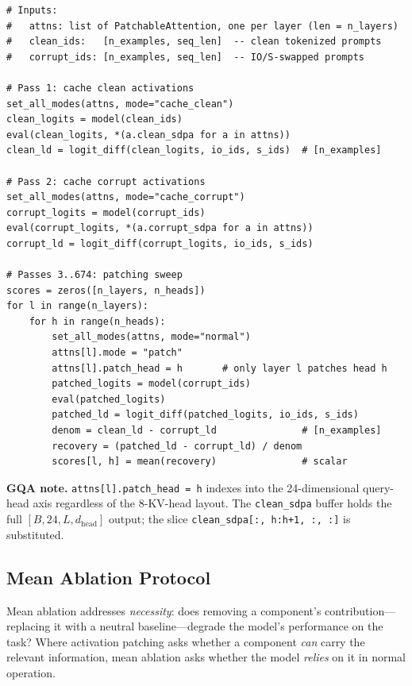 \documentclass[11pt,a4paper]{article}
\begin{document}
\begin{lstlisting}[style=python, caption={Pseudocode for the activation patching sweep. \texttt{attns} is a list of \texttt{PatchableAttention} modules, one per layer. \texttt{set\_all\_modes} sets every module's mode simultaneously.}]
# Inputs:
#   attns: list of PatchableAttention, one per layer (len = n_layers)
#   clean_ids:   [n_examples, seq_len]  -- clean tokenized prompts
#   corrupt_ids: [n_examples, seq_len]  -- IO/S-swapped prompts

# Pass 1: cache clean activations
set_all_modes(attns, mode="cache_clean")
clean_logits = model(clean_ids)
eval(clean_logits, *(a.clean_sdpa for a in attns))
clean_ld = logit_diff(clean_logits, io_ids, s_ids)  # [n_examples]

# Pass 2: cache corrupt activations
set_all_modes(attns, mode="cache_corrupt")
corrupt_logits = model(corrupt_ids)
eval(corrupt_logits, *(a.corrupt_sdpa for a in attns))
corrupt_ld = logit_diff(corrupt_logits, io_ids, s_ids)

# Passes 3..674: patching sweep
scores = zeros([n_layers, n_heads])
for l in range(n_layers):
    for h in range(n_heads):
        set_all_modes(attns, mode="normal")
        attns[l].mode = "patch"
        attns[l].patch_head = h       # only layer l patches head h
        patched_logits = model(corrupt_ids)
        eval(patched_logits)
        patched_ld = logit_diff(patched_logits, io_ids, s_ids)
        denom = clean_ld - corrupt_ld               # [n_examples]
        recovery = (patched_ld - corrupt_ld) / denom
        scores[l, h] = mean(recovery)               # scalar
\end{lstlisting}

\textbf{GQA note.} \texttt{attns[l].patch\_head = h} indexes into the 24-dimensional
query-head axis regardless of the 8-KV-head layout. The \texttt{clean\_sdpa} buffer
holds the full $[B, 24, L, d_\text{head}]$ output; the slice
\texttt{clean\_sdpa[:, h:h+1, :, :]} is substituted.

\subsection{Mean Ablation Protocol}
\label{sec:ablation}

Mean ablation addresses \emph{necessity}: does removing a component's
contribution---replacing it with a neutral baseline---degrade the model's performance
on the task? Where activation patching asks whether a component \emph{can} carry the
relevant information, mean ablation asks whether the model \emph{relies} on it in
normal operation.
\end{document}
